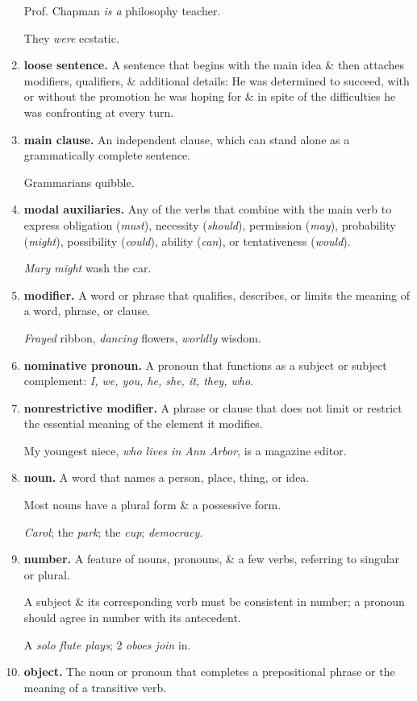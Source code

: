 \documentclass{article}
\begin{document}
\begin{enumerate}
	Prof. Chapman {\it is a} philosophy teacher.
	
	They {\it were} ecstatic.
	\item {\bf loose sentence.} A sentence that begins with the main idea \& then attaches modifiers, qualifiers, \& additional details: He was determined to succeed, with or without the promotion he was hoping for \& in spite of the difficulties he was confronting at every turn.
	\item {\bf main clause.} An independent clause, which can stand alone as a grammatically complete sentence.
	
	Grammarians quibble.
	\item {\bf modal auxiliaries.} Any of the verbs that combine with the main verb to express obligation ({\it must}), necessity ({\it should}), permission ({\it may}), probability ({\it might}), possibility ({\it could}), ability ({\it can}), or tentativeness ({\it would}).
	
	{\it Mary might} wash the car.
	\item {\bf modifier.} A word or phrase that qualifies, describes, or limits the meaning of a word, phrase, or clause.
	
	{\it Frayed} ribbon, {\it dancing} flowers, {\it worldly} wisdom.
	\item {\bf nominative pronoun.} A pronoun that functions as a subject or subject complement: {\it I, we, you, he, she, it, they, who}.
	\item {\bf nonrestrictive modifier.} A phrase or clause that does not limit or restrict the essential meaning of the element it modifies.
	
	My youngest niece, {\it who lives in Ann Arbor}, is a magazine editor.
	\item {\bf noun.} A word that names a person, place, thing, or idea.
	
	Most nouns have a plural form \& a possessive form.
	
	{\it Carol}; the {\it park}; the {\it cup}; {\it democracy}.
	\item {\bf number.} A feature of nouns, pronouns, \& a few verbs, referring to singular or plural.
	
	A subject \& its corresponding verb must be consistent in number; a pronoun should agree in number with its antecedent.
	
	A {\it solo flute plays}; 2 {\it oboes join} in.
	\item {\bf object.} The noun or pronoun that completes a prepositional phrase or the meaning of a transitive verb.
	

\end{enumerate}
\end{document}
